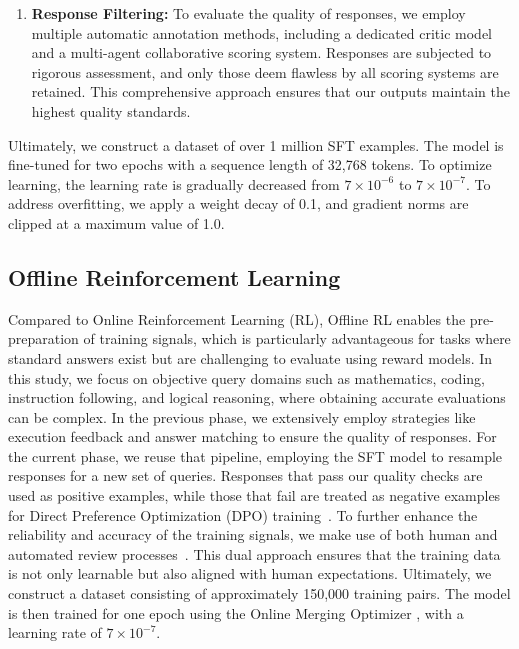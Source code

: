 \documentclass{article}
\begin{document}
\begin{enumerate}[label=(\arabic*)]
    \item \textbf{Response Filtering:}  To evaluate the quality of responses, we employ multiple automatic annotation methods, including a dedicated critic model and a multi-agent collaborative scoring system. Responses are subjected to rigorous assessment, and only those deem flawless by all scoring systems are retained. This comprehensive approach ensures that our outputs maintain the highest quality standards.
    
\end{enumerate}

Ultimately, we construct a dataset of over 1 million SFT examples. The model is fine-tuned for two epochs with a sequence length of 32,768 tokens. To optimize learning, the learning rate is gradually decreased from $7 \times 10^{-6}$ to $7 \times 10^{-7}$. To address overfitting, we apply a weight decay of 0.1, and gradient norms are clipped at a maximum value of 1.0.

\subsection{Offline Reinforcement Learning}

Compared to Online Reinforcement Learning (RL), Offline RL enables the pre-preparation of training signals, which is particularly advantageous for tasks where standard answers exist but are challenging to evaluate using reward models. 
In this study, we focus on objective query domains such as mathematics, coding, instruction following, and logical reasoning, where obtaining accurate evaluations can be complex.
In the previous phase, we extensively employ strategies like execution feedback and answer matching to ensure the quality of responses.
For the current phase, we reuse that pipeline, employing the SFT model to resample responses for a new set of queries. Responses that pass our quality checks are used as positive examples, while those that fail are treated as negative examples for Direct Preference Optimization (DPO) training~\citep{rafailov2024direct}.
To further enhance the reliability and accuracy of the training signals, we make use of both human and automated review processes~\citep{cao2024towards}. This dual approach ensures that the training data is not only learnable but also aligned with human expectations.
Ultimately, we construct a dataset consisting of approximately 150,000 training pairs. 
The model is then trained for one epoch using the Online Merging Optimizer \citep{lu2024online}, with a learning rate of $7 \times 10^{-7}$.
\end{document}
